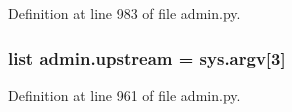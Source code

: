 Definition at line 983 of file admin.\-py.

\hypertarget{namespaceadmin_ae04b67153bc11f5b3a23e4fd760832fb}{
\subsubsection[{upstream}]{\setlength{\rightskip}{0pt plus 5cm}list admin.\-upstream = sys.\-argv\mbox{[}3\mbox{]}}}\label{namespaceadmin_ae04b67153bc11f5b3a23e4fd760832fb}


Definition at line 961 of file admin.\-py.

